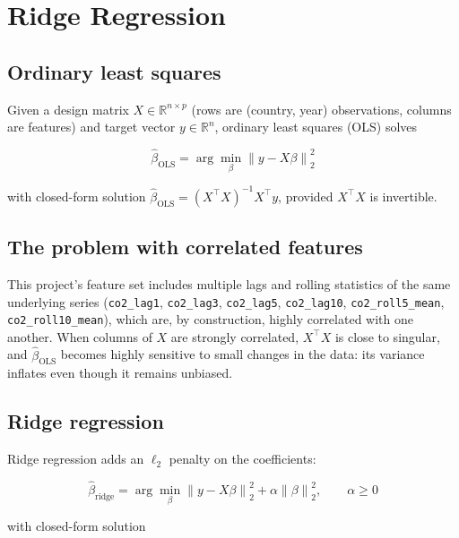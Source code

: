 \section{Ridge Regression}
\label{sec:ridge}

\subsection{Ordinary least squares}

Given a design matrix $X \in \mathbb{R}^{n\times p}$ (rows are
(country, year) observations, columns are features) and target vector
$y \in \mathbb{R}^n$, ordinary least squares (OLS) solves

\begin{equation}
\label{eq:ols}
\hat\beta_{\mathrm{OLS}} = \arg\min_{\beta} \left\| y - X\beta \right\|_2^2
\end{equation}

with closed-form solution
$\hat\beta_{\mathrm{OLS}} = (X^\top X)^{-1}X^\top y$, provided
$X^\top X$ is invertible.

\subsection{The problem with correlated features}

This project's feature set includes multiple lags and rolling statistics
of the same underlying series (\texttt{co2\_lag1}, \texttt{co2\_lag3},
\texttt{co2\_lag5}, \texttt{co2\_lag10}, \texttt{co2\_roll5\_mean},
\texttt{co2\_roll10\_mean}), which are, by construction, highly correlated
with one another. When columns of $X$ are strongly correlated,
$X^\top X$ is close to singular, and $\hat\beta_{\mathrm{OLS}}$ becomes
highly sensitive to small changes in the data: its variance inflates even
though it remains unbiased.

\subsection{Ridge regression}

Ridge regression adds an $\ell_2$ penalty on the coefficients:

\begin{equation}
\label{eq:ridge}
\hat\beta_{\mathrm{ridge}} = \arg\min_{\beta}
\left\| y - X\beta \right\|_2^2 + \alpha \left\| \beta \right\|_2^2,
\qquad \alpha \ge 0
\end{equation}

with closed-form solution


